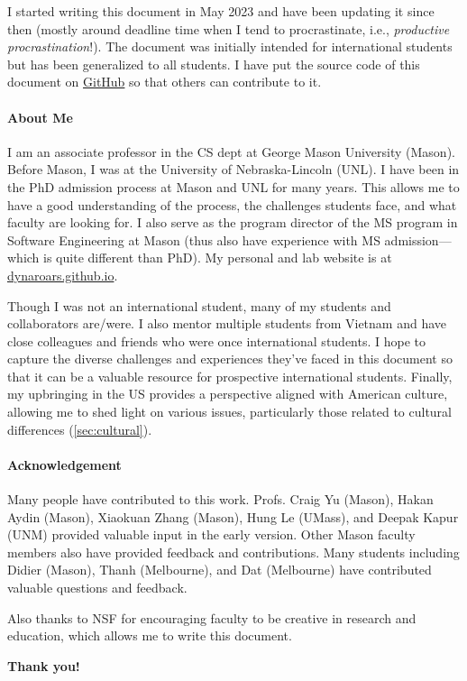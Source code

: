 \documentclass[oneside,11pt,dvipsnames]{book}
\begin{document}
I started writing this document in May 2023 and have been updating it since then (mostly around deadline time when I tend to procrastinate, i.e., \emph{productive procrastination}!). The document was initially intended for international students but has been generalized to all students.
I have put the source code of this document on \href{https://github.com/nguyenthanhvuh/phd-cs-us}{GitHub} so that others can contribute to it.

\paragraph{About Me} I am an associate professor in the CS dept at George Mason University (Mason). Before Mason, I was at the University of Nebraska-Lincoln (UNL). I have been in the PhD admission process at Mason and UNL for many years. This allows me to have a good understanding of the process, the challenges students face, and what faculty are looking for. I also serve as the program director of the MS program in Software Engineering at Mason (thus also have experience with MS admission---which is quite different than PhD). My personal and lab website is at \href{https://dynaroars.github.io}{dynaroars.github.io}.

Though I was not an international student, many of my students and collaborators are/were. I also mentor multiple students from Vietnam and have close colleagues and friends who were once international students. I hope to capture the diverse challenges and experiences they've faced in this document so that it can be a valuable resource for prospective international students.
Finally, my upbringing in the US provides a perspective aligned with American culture, allowing me to shed light on various issues, particularly those related to cultural differences (\autoref{sec:cultural}).




\paragraph{Acknowledgement} Many people have contributed to this work.
Profs. Craig Yu (Mason), Hakan Aydin (Mason), 
Xiaokuan Zhang (Mason), Hung Le (UMass), and Deepak Kapur (UNM) provided valuable input in the early version. Other Mason faculty members also have provided feedback and contributions.  Many students including Didier (Mason), Thanh (Melbourne), and Dat (Melbourne) have contributed valuable questions and feedback. 

Also thanks to NSF for encouraging faculty to be creative in research and education, which allows me to write this document. 

\textbf{Thank you!}

%
%
\end{document}
